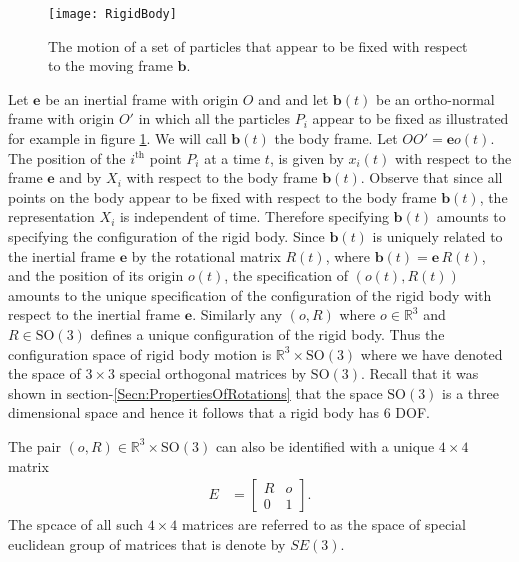 \documentclass[graybox,envcountchap,sectrefs]{svmonoMuga}
\begin{document}
\begin{figure}[ht]
\begin{center}
\texttt{[image: RigidBody]}
\renewcommand{\baselinestretch}{1}\selectfont
\caption{The motion of a set of particles that  appear to be fixed with respect to the moving frame $\mathbf{b}$.}
\label{Fig:RigidBody0}
\renewcommand{\baselinestretch}{1.5}\selectfont
\end{center}
\end{figure}
Let $\mathbf{e}$ be an inertial frame with origin $O$ and and let $\mathbf{b}(t)$ be an ortho-normal frame with origin $O'$ in which all the particles $P_i$ appear to be fixed as illustrated for example in figure \ref{Fig:RigidBody0}. We will call $\mathbf{b}(t)$ the body frame. Let $OO'=\mathbf{e}o(t)$. The position of the $i^\mathrm{th}$ point $P_i$ at a time $t$, is given by $x_i(t)$ with respect to the frame $\mathbf{e}$ and by $X_i$ 
with respect to the body frame $\mathbf{b}(t)$. Observe that since all points on the body appear to be fixed with respect to the body frame $\mathbf{b}(t)$, the representation $X_i$ is independent of time. Therefore specifying $\mathbf{b}(t)$ amounts to specifying the configuration 
of the rigid body. Since $\mathbf{b}(t)$ is uniquely related to the inertial frame $\mathbf{e}$ by the rotational matrix $R(t)$, where $\mathbf{b}(t)=\mathbf{e}\,R(t)$, and the position of its origin $o(t)$, the specification of $(o(t),R(t))$ amounts to the unique specification of the configuration of the rigid body with respect to the inertial frame $\mathbf{e}$. Similarly any $(o,R)$ where $o\in \mathbb{R}^3$ and $R\in \mathrm{SO}(3)$ defines a unique configuration of the rigid body. Thus the configuration space of rigid body motion is $ \mathbb{R}^3\times \mathrm{SO}(3)$ where we have denoted the space of $3\times 3$ special orthogonal matrices by $\mathrm{SO}(3)$. Recall that it was shown in section-\ref{Secn:PropertiesOfRotations} that the space $\mathrm{SO}(3)$ is a three dimensional space and hence it follows that a rigid body has 6 DOF. 

The pair $(o,R)\in \mathbb{R}^3 \times \mathrm{SO}(3)$ can also be identified with a unique $4\times 4$ matrix
\begin{align}
E&=\begin{bmatrix}
R & o \\ 0 & 1\end{bmatrix}.
\end{align}
The spcace of all such $4\times 4$ matrices are referred to as the space of special euclidean group of matrices that is denote by $SE(3)$. 
\end{document}
